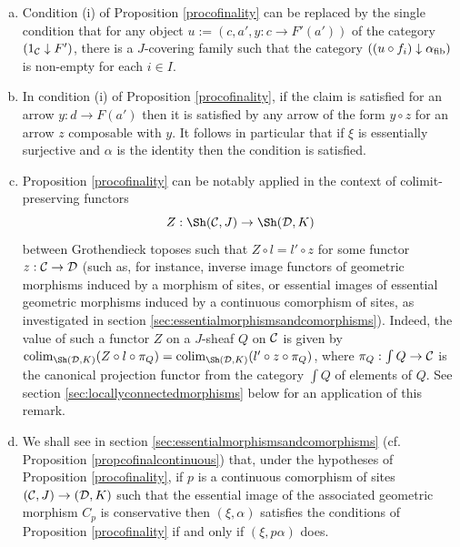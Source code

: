 \documentclass[a4paper,12pt]{article}
\begin{document}
\begin{remarks}\label{rempropcofinality}
	\begin{enumerate}[(a)]
		\item Condition (i) of Proposition \ref{procofinality} can be replaced by the single condition that for any object $u:=(c, a', y:c\to F'(a'))$ of the category $(1_{\cal C}\downarrow F')$, there is a $J$-covering family such that the category $((u\circ f_{i})\downarrow \alpha_{\textup{fib}})$ is non-empty for each $i\in I$.
		
		\item In condition (i) of Proposition \ref{procofinality}, if the claim is satisfied for an arrow $y:d\to F(a')$ then it is satisfied by any arrow of the form $y\circ z$ for an arrow $z$ composable with $y$. It follows in particular that if $\xi$ is essentially surjective and $\alpha$ is the identity then the condition is satisfied.
		
		\item Proposition \ref{procofinality} can be notably applied in the context of colimit-preserving functors $$Z:\Sh({\cal C}, J)\to \Sh({\cal D}, K)$$ between Grothendieck toposes such that $Z\circ l=l'\circ z$ for some functor $z:{\cal C}\to {\cal D}$ (such as, for instance, inverse image functors of geometric morphisms induced by a morphism of sites, or essential images of essential geometric morphisms induced by a continuous comorphism of sites, as investigated in section \ref{sec:essentialmorphismsandcomorphisms}). Indeed, the value of such a functor $Z$ on a $J$-sheaf $Q$ on $\cal C$ is given by $\textup{colim}_{\Sh({\cal D}, K)}(Z\circ l \circ \pi_{Q})=\textup{colim}_{\Sh({\cal D}, K)}(l'\circ z \circ \pi_{Q})$, where $\pi_{Q}:{\int Q} \to {\cal C}$ is the canonical projection functor from the category $\int Q$ of elements of $Q$. See section \ref{sec:locallyconnectedmorphisms} below for an application of this remark. 
		
		\item We shall see in section \ref{sec:essentialmorphismsandcomorphisms} (cf. Proposition \ref{propcofinalcontinuous}) that, under the hypotheses of Proposition \ref{procofinality}, if $p$ is a continuous comorphism of sites $({\cal C}, J)\to ({\cal D}, K)$ such that the essential image of the associated geometric morphism $C_{p}$ is conservative then $(\xi, \alpha)$ satisfies the conditions of Proposition \ref{procofinality} if and only if $(\xi, p\alpha)$ does.
	\end{enumerate}
\end{remarks}
\end{document}
